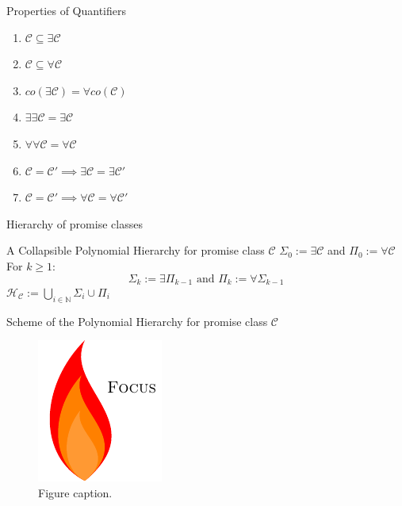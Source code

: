         \begin{frame}{Properties of Quantifiers}
            \begin{enumerate}
                \item $\mathcal{C} \subseteq \exists{\mathcal{C}}$
                \item $\mathcal{C} \subseteq \forall{\mathcal{C}}$
                \pause
                \item $co(\exists \mathcal{C}) = \forall co(\mathcal{C})$
                \pause
                \item $\exists \exists \mathcal{C} = \exists{\mathcal{C}}$
                \item $\forall \forall \mathcal{C} = \forall{\mathcal{C}}$
                \pause
                \item $\mathcal{C} = \mathcal{C}' \implies \exists{\mathcal{C}} = \exists{\mathcal{C}}'$
                \item $\mathcal{C} = \mathcal{C}' \implies \forall{\mathcal{C}} = \forall{\mathcal{C}}'$
            \end{enumerate}
        \end{frame}
        \begin{frame}{Hierarchy of promise classes}
            \begin{block}{A Collapsible Polynomial Hierarchy for promise class $\mathcal{C}$}
                $\Sigma_0 := \exists \mathcal{C}$ and
                $\Pi_0 := \forall \mathcal{C}$\\
                For $k \geq 1 $:
                    $$\Sigma_k := \exists\Pi_{k-1} \text{ and }
                    \Pi_k := \forall\Sigma_{k-1}$$
                $\mathcal{H}_{\mathcal{C}} := \bigcup\limits_{i \in \mathbb{N}} \Sigma_i \cup \Pi_i$
                
            \end{block}
        \end{frame}

        \begin{frame}{Scheme of the Polynomial Hierarchy for promise class $\mathcal{C}$}            
            \begin{figure}
                \centering
                \includegraphics{focus-logo.pdf}
                \caption{Figure caption.}
                \label{fig:focuslogo}
            \end{figure}
        \end{frame}
        
